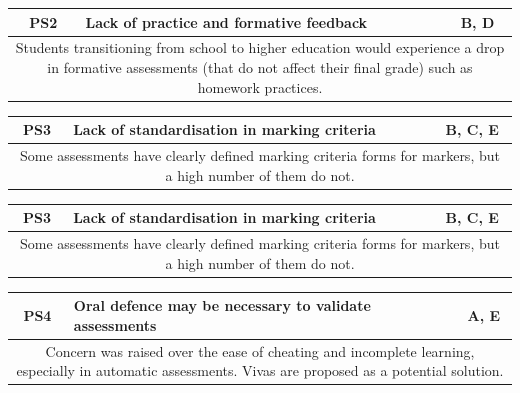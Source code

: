 \begin{table}[!ht]
	\begin{tabularx}{\textwidth}{|c|X|c|}
		\hline
		PS2 & \textbf{Lack of practice and formative feedback} & B, D       \\
		\hline
		\multicolumn{3}{|X|}{Students transitioning from school to higher education would experience a drop in formative assessments
			(that do not affect their final grade) such as homework practices.} \\
		\hline
	\end{tabularx}
\end{table}

\begin{table}[!ht]
	\begin{tabularx}{\textwidth}{|c|X|c|}
		\hline
		PS3 & \textbf{Lack of standardisation in marking criteria} & B, C, E \\
		\hline
		\multicolumn{3}{|X|}{Some assessments have clearly defined marking criteria forms for markers, but a high
			number of them do not.}                                              \\
		\hline
	\end{tabularx}
\end{table}

\begin{table}[!ht]
	\begin{tabularx}{\textwidth}{|c|X|c|}
		\hline
		PS3 & \textbf{Lack of standardisation in marking criteria} & B, C, E \\
		\hline
		\multicolumn{3}{|X|}{Some assessments have clearly defined marking criteria forms for markers, but a high
			number of them do not.}                                              \\
		\hline
	\end{tabularx}
\end{table}

\begin{table}[!ht]
	\begin{tabularx}{\textwidth}{|c|X|c|}
		\hline
		PS4 & \textbf{Oral defence may be necessary to validate assessments} & A, E                 \\
		\hline
		\multicolumn{3}{|X|}{Concern was raised over the ease of cheating and incomplete
			learning, especially in automatic assessments. Vivas are proposed as a potential solution.} \\
		\hline
	\end{tabularx}
\end{table}

